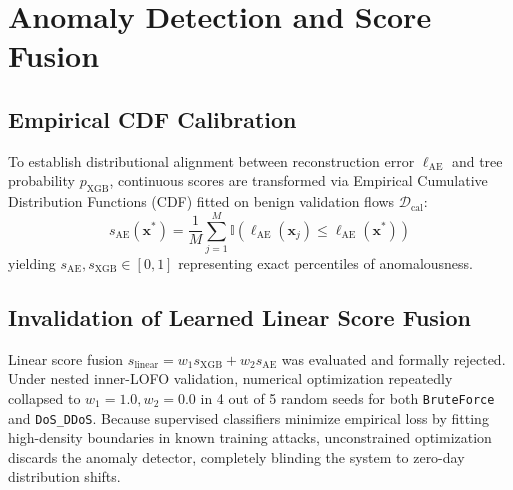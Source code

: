 \documentclass[conference]{IEEEtran}
\begin{document}
\section{Anomaly Detection and Score Fusion}

\subsection{Empirical CDF Calibration}
To establish distributional alignment between reconstruction error $\ell_{\text{AE}}$ and tree probability $p_{\text{XGB}}$, continuous scores are transformed via Empirical Cumulative Distribution Functions (CDF) fitted on benign validation flows $\mathcal{D}_{\text{cal}}$:
\begin{equation}
s_{\text{AE}}(\mathbf{x}^*) = \frac{1}{M} \sum_{j=1}^M \mathbb{I}\left( \ell_{\text{AE}}(\mathbf{x}_j) \le \ell_{\text{AE}}(\mathbf{x}^*) \right)
\end{equation}
yielding $s_{\text{AE}}, s_{\text{XGB}} \in [0, 1]$ representing exact percentiles of anomalousness.

\subsection{Invalidation of Learned Linear Score Fusion}
Linear score fusion $s_{\text{linear}} = w_1 s_{\text{XGB}} + w_2 s_{\text{AE}}$ was evaluated and formally rejected. Under nested inner-LOFO validation, numerical optimization repeatedly collapsed to $w_1 = 1.0, w_2 = 0.0$ in 4 out of 5 random seeds for both \texttt{BruteForce} and \texttt{DoS\_DDoS}. Because supervised classifiers minimize empirical loss by fitting high-density boundaries in known training attacks, unconstrained optimization discards the anomaly detector, completely blinding the system to zero-day distribution shifts.
\end{document}
